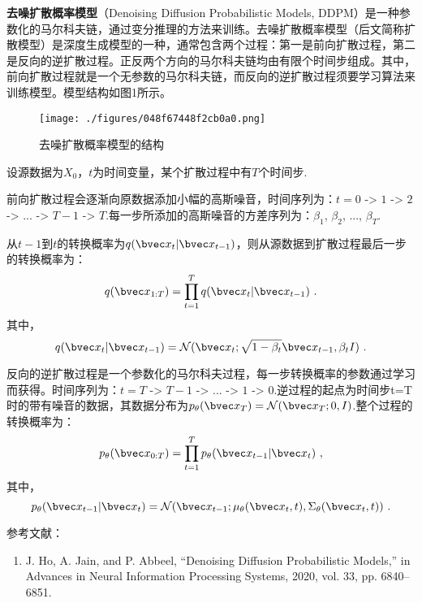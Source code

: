 
\textbf{去噪扩散概率模型}（Denoising Diffusion Probabilistic Models, DDPM）是一种参数化的马尔科夫链，通过变分推理的方法来训练。去噪扩散概率模型（后文简称扩散模型）是深度生成模型的一种，通常包含两个过程：第一是前向扩散过程，第二是反向的逆扩散过程。正反两个方向的马尔科夫链均由有限个时间步组成。其中，前向扩散过程就是一个无参数的马尔科夫链，而反向的逆扩散过程须要学习算法来训练模型。模型结构如图1所示。
\begin{figure}[ht]
\centering
\texttt{[image: ./figures/048f67448f2cb0a0.png]}
\caption{去噪扩散概率模型的结构} \label{fig_DDPM_1}
\end{figure}

设源数据为$X_0$，$t$为时间变量，某个扩散过程中有$T$个时间步.

前向扩散过程会逐渐向原数据添加小幅的高斯噪音，时间序列为：$t=0$ -> $1$ -> $2$ -> ... -> $T-1$ -> $T$.每一步所添加的高斯噪音的方差序列为：$\beta_1$, $\beta_2$, ..., $\beta_T$.

从$t-1$到$t$的转换概率为$q(\bvec x_t|\bvec x_{t-1})$，则从源数据到扩散过程最后一步的转换概率为：
\begin{equation}
q(\bvec x_{1:T})=\prod_{t=1}^{T}q(\bvec x_{t}|\bvec x_{t-1})~.
\end{equation}
其中，
\begin{equation}
q(\bvec x_{t}|\bvec x_{t-1})=\mathcal{N}(\bvec x_t;\sqrt{1-\beta_t}\bvec x_{t-1},\beta_tI)~.
\end{equation}

反向的逆扩散过程是一个参数化的马尔科夫过程，每一步转换概率的参数通过学习而获得。时间序列为：$t=T$ -> $T-1$ -> ... -> $1$ -> $0$.逆过程的起点为时间步t=T时的带有噪音的数据，其数据分布为$p_\theta(\bvec x_T)=\mathcal{N}(\bvec x_T;0,I)$.整个过程的转换概率为：
\begin{equation}
p_{\theta}(\bvec x_{0:T})=\prod_{t=1}^{T}p_{\theta}(\bvec x_{t-1}|\bvec x_{t})~,
\end{equation}
其中，
\begin{equation}
p_{\theta}(\bvec x_{t-1}|\bvec x_{t})=\mathcal{N}(\bvec x_{t-1};\mu_\theta(\bvec x_{t},t),\Sigma_\theta(\bvec x_t,t))~.
\end{equation}


参考文献：
\begin{enumerate}
\item J. Ho, A. Jain, and P. Abbeel, “Denoising Diffusion Probabilistic Models,” in Advances in Neural Information Processing Systems, 2020, vol. 33, pp. 6840–6851.
\end{enumerate}